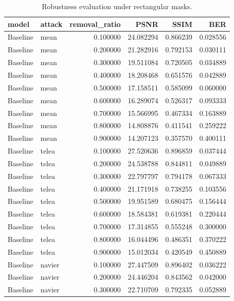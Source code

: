 
\begin{table}[h]
\centering

\caption{Robustness evaluation under rectangular masks.}
\label{tab:rectangular}

\begin{tabular}{llrrrr}
\toprule
model & attack & removal\_ratio & PSNR & SSIM & BER \\
\midrule
Baseline & mean & 0.100000 & 24.082294 & 0.866239 & 0.028556 \\
Baseline & mean & 0.200000 & 21.282916 & 0.792153 & 0.030111 \\
Baseline & mean & 0.300000 & 19.511084 & 0.720505 & 0.034889 \\
Baseline & mean & 0.400000 & 18.208468 & 0.651576 & 0.042889 \\
Baseline & mean & 0.500000 & 17.158511 & 0.585099 & 0.060000 \\
Baseline & mean & 0.600000 & 16.289074 & 0.526317 & 0.093333 \\
Baseline & mean & 0.700000 & 15.566995 & 0.467334 & 0.163889 \\
Baseline & mean & 0.800000 & 14.808876 & 0.411541 & 0.259222 \\
Baseline & mean & 0.900000 & 14.207123 & 0.357570 & 0.400111 \\
Baseline & telea & 0.100000 & 27.520636 & 0.896859 & 0.037444 \\
Baseline & telea & 0.200000 & 24.538788 & 0.844811 & 0.049889 \\
Baseline & telea & 0.300000 & 22.797797 & 0.794178 & 0.067333 \\
Baseline & telea & 0.400000 & 21.171918 & 0.738255 & 0.103556 \\
Baseline & telea & 0.500000 & 19.951589 & 0.680475 & 0.156444 \\
Baseline & telea & 0.600000 & 18.584381 & 0.619381 & 0.220444 \\
Baseline & telea & 0.700000 & 17.314855 & 0.555248 & 0.300000 \\
Baseline & telea & 0.800000 & 16.044496 & 0.486351 & 0.370222 \\
Baseline & telea & 0.900000 & 15.012034 & 0.420549 & 0.450889 \\
Baseline & navier & 0.100000 & 27.447509 & 0.896402 & 0.036222 \\
Baseline & navier & 0.200000 & 24.446204 & 0.843562 & 0.042000 \\
Baseline & navier & 0.300000 & 22.710709 & 0.792335 & 0.052889 \\

\end{tabular}
\end{table}
